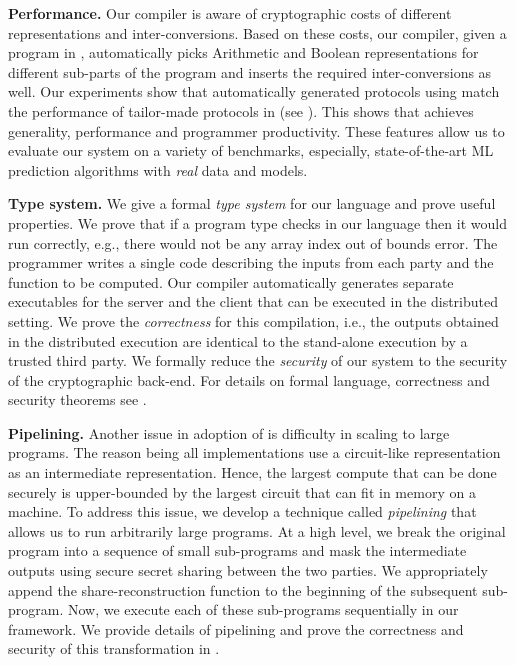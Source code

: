 \textbf{Performance.} Our compiler is aware of cryptographic costs of different representations and inter-conversions.  Based on these costs, our compiler, given a program in \tool, automatically picks Arithmetic and Boolean representations for different sub-parts of the program and inserts the required inter-conversions as well. 
Our experiments show that automatically generated protocols using \tool match the performance of tailor-made protocols in \cite{minionn,shafindss} (see ). This shows that  \tool achieves generality, performance and programmer productivity. These features allow us to evaluate our system on a variety of benchmarks, especially, state-of-the-art ML prediction algorithms with \emph{real} data and models. 

\textbf{Type system.} We give a formal {\em type system} for our language and prove useful properties. We prove that if a program type checks in our language then it would run correctly, e.g., there would not be any array index out of bounds error. The programmer writes a single code describing the inputs from each party and the function to be computed. Our compiler automatically generates separate executables for the server and the client that can be executed in the distributed setting. We prove the {\em correctness} for this compilation, i.e., the outputs obtained in the distributed execution are identical to the stand-alone execution by a trusted third party. We formally reduce the {\em security} of our system to the security of the cryptographic back-end. For details on formal language, correctness and security theorems see .


\textbf{Pipelining.} Another issue in adoption of \mpc is difficulty in scaling to large programs. 
The reason being all \mpc implementations use a circuit-like representation as an intermediate representation. Hence, the largest compute that can be done securely is upper-bounded by the largest circuit that can fit in memory on a machine. 
To address this issue, we develop a technique called \emph{pipelining} that allows us to run arbitrarily large programs. At a high level, we break the original program into a sequence of small sub-programs and mask the intermediate outputs using secure secret sharing between the two parties. We appropriately append the share-reconstruction function to the beginning of the subsequent sub-program. Now, we execute each of these sub-programs sequentially in our framework. We provide details of pipelining and prove the correctness and security of this transformation in .

